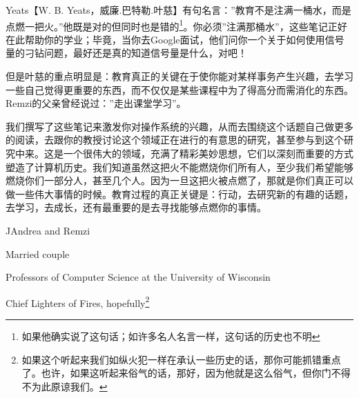  \vspace*{0.0cm}
\thispagestyle{empty}
\centerline{}\vspace{2cm}

Yeats【W. B. Yeats，威廉.巴特勒.叶慈】有句名言：”教育不是注满一桶水，而是点燃一把火。”他既是对的但同时也是错的\footnote{如果他确实说了这句话；如许多名人名言一样，这句话的历史也不明}。你必须”注满那桶水”，这些笔记正好在此帮助你的学业；毕竟，当你去Google面试，他们问你一个关于如何使用信号量的刁钻问题，最好还是真的知道信号量是什么，对吧！

但是叶慈的重点明显是：教育真正的关键在于使你能对某样事务产生兴趣，去学习一些自己觉得更重要的东西，而不仅仅是某些课程中为了得高分而需消化的东西。Remzi的父亲曾经说过：”走出课堂学习”。

我们撰写了这些笔记来激发你对操作系统的兴趣，从而去围绕这个话题自己做更多的阅读，去跟你的教授讨论这个领域正在进行的有意思的研究，甚至参与到这个研究中来。这是一个很伟大的领域，充满了精彩美妙思想，它们以深刻而重要的方式塑造了计算机历史。我们知道虽然这把火不能燃烧你们所有人，至少我们希望能够燃烧你们一部分人，甚至几个人。因为一旦这把火被点燃了，那就是你们真正可以做一些伟大事情的时候。教育过程的真正关键是：行动，去研究新的有趣的话题，去学习，去成长，还有最重要的是去寻找能够点燃你的事情。


\vspace{1cm}

\hfill JAndrea and Remzi\hspace{0.2em}

\hfill Married couple \hspace{0.2em}

\hfill Professors of Computer Science at the University of Wisconsin\hspace{0.2em}

\hfill Chief Lighters of Fires, hopefully\footnote{如果这个听起来我们如纵火犯一样在承认一些历史的话，那你可能抓错重点了。也许，如果这听起来俗气的话，那好，因为他就是这么俗气，但你门不得不为此原谅我们。}\hspace{0.2em}
